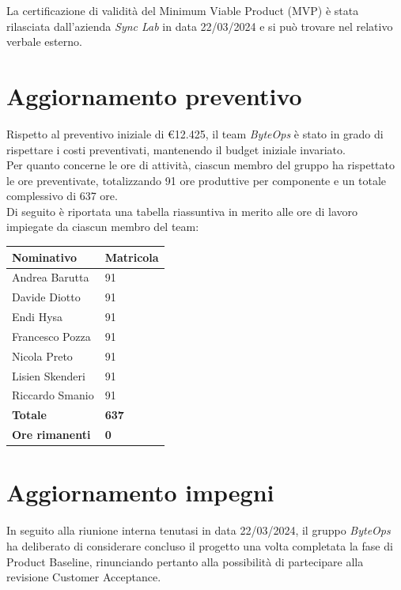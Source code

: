 \documentclass{article}
\begin{document}
La certificazione di validità del Minimum Viable Product (MVP) è stata rilasciata dall'azienda \textit{Sync Lab} in data 22/03/2024 e si può trovare nel relativo verbale esterno.


\section{Aggiornamento preventivo}
Rispetto al preventivo iniziale di €12.425, il team \textit{ByteOps} è stato in grado di rispettare i costi preventivati, mantenendo il budget iniziale invariato. \\
Per quanto concerne le ore di attività, ciascun membro del gruppo ha rispettato le ore preventivate, totalizzando 91 ore produttive per componente e un totale complessivo di 637 ore.\\
Di seguito è riportata una tabella riassuntiva in merito alle ore di lavoro impiegate da ciascun membro del team:
\begin{center}
    \begin{tabular}{|C{4cm}|C{2cm}|}
    \hline
        \textbf{Nominativo} & \textbf{Matricola} \\
        \hline\hline
        Andrea Barutta  & 91 \\
        \hline
        Davide Diotto   & 91 \\ 
        \hline
        Endi Hysa       & 91 \\ 
        \hline
        Francesco Pozza & 91 \\ 
        \hline
        Nicola Preto    & 91 \\ 
        \hline
        Lisien Skenderi & 91 \\ 
        \hline
        Riccardo Smanio & 91 \\ 
        \hline\hline
        \textbf{Totale} & \textbf{637} \\ 
        \hline
        \textbf{Ore rimanenti} & \textbf{0} \\
        \hline
    \end{tabular}
\end{center}

\section{Aggiornamento impegni}
In seguito alla riunione interna tenutasi in data 22/03/2024, il gruppo \textit{ByteOps} ha deliberato di considerare concluso il progetto una volta completata la fase di Product Baseline, rinunciando pertanto alla possibilità di partecipare alla revisione Customer Acceptance.
\end{document}
